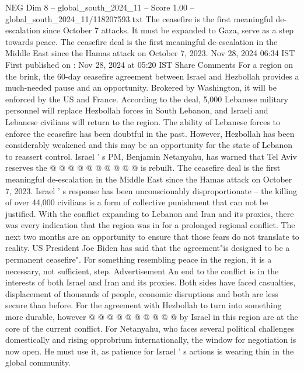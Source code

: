 \begin{textsample}{NEG Dim 8 – global\_south\_2024\_11 – Score 1.00 – global\_south\_2024\_11/118207593.txt}  \label{ex:f8_neg_295}
The ceasefire is the first meaningful de-escalation since October 7 attacks.
It must be expanded to Gaza, serve as a step towards peace.
The ceasefire deal is the first meaningful de-escalation in the Middle East since the Hamas attack on October 7, 2023.
Nov 28, 2024 06:34 IST First published on : Nov 28, 2024 at 05:20 IST Share Comments For a region on the brink, the 60-day ceasefire agreement between Israel and Hezbollah provides a much-needed pause and an opportunity.
Brokered by Washington, it will be enforced by the US and France.
According to the deal, 5,000 Lebanese military personnel will replace Hezbollah forces in South Lebanon, and Israeli and Lebanese civilians will return to the region.
The ability of Lebanese forces to enforce the ceasefire has been doubtful in the past.
However, Hezbollah has been considerably weakened and this may be an opportunity for the state of Lebanon to reassert control.
Israel ' s PM, Benjamin Netanyahu, has warned that Tel Aviv reserves the @ @ @ @ @ @ @ @ @ @ is rebuilt.
The ceasefire deal is the first meaningful de-escalation in the Middle East since the Hamas attack on October 7, 2023.
Israel ' s response has been unconscionably disproportionate -- the killing of over 44,000 civilians is a form of collective punishment that can not be justified.
With the conflict expanding to Lebanon and Iran and its proxies, there was every indication that the region was in for a prolonged regional conflict.
The next two months are an opportunity to ensure that those fears do not translate to reality.
US President Joe Biden has said that the agreement"is designed to be a permanent ceasefire".
For something resembling peace in the region, it is a necessary, not sufficient, step.
Advertisement An end to the conflict is in the interests of both Israel and Iran and its proxies.
Both sides have faced casualties, displacement of thousands of people, economic disruptions and both are less secure than before.
For the agreement with Hezbollah to turn into something more durable, however @ @ @ @ @ @ @ @ @ @ by Israel in this region are at the core of the current conflict.
For Netanyahu, who faces several political challenges domestically and rising opprobrium internationally, the window for negotiation is now open.
He must use it, as patience for Israel ' s actions is wearing thin in the global community.

\end{textsample}
